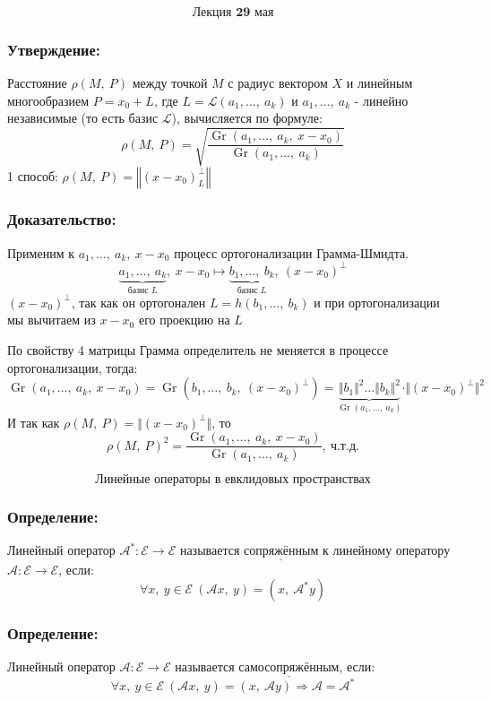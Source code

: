 \documentclass[12pt, letterpaper, twoside]{article}
\newcommand{\Underl}[1]{$\underline{\text{#1}}$}
\newcommand{\Gr}{\operatorname{Gr}}
\begin{document}
\[\textbf{Лекция 29 мая}\]

    \subsubsection*{Утверждение:}
    Расстояние $\rho (M,\ P)$ между точкой $M$ с радиус вектором $X$ и линейным многообразием $P = x_0 + L$, где $L = \mathcal{L}(a_1,\dots,\ a_k)$ и $a_1,\dots,\ a_k$ - линейно независимые (то есть базис $\mathcal{L}$), вычисляется по формуле:
    \[\rho(M,\ P) = \sqrt{\frac{\Gr(a_1,\dots,\ a_k,\ x - x_0)}{\Gr(a_1,\dots,\ a_k)}}\]
    1 способ: $\rho (M,\ P) = \left\Vert (x - x_0)^{\bot}_L \right\Vert$
    \subsubsection*{Доказательство:}
    Применим к $a_1,\dots,\ a_k,\ x - x_0$ процесс ортогонализации Грамма-Шмидта.
    \[\underset{\text{базис $L$}}{\underbrace{a_1,\dots,\ a_k}},\ x - x_0\longmapsto \underset{\text{базис $L$}}{\underbrace{b_1,\dots,\ b_k}},\ (x - x_0)^{\bot}\]
    $(x - x_0)^{\bot}$, так как он ортогонален $L = h(b_1,\dots,\ b_k)$ и при ортогонализации мы вычитаем из $x - x_0$ его проекцию на $L$

    По свойству 4 матрицы Грамма определитель не меняется в процессе ортогонализации, тогда:
    \[\Gr(a_1,\dots,\ a_k,\ x - x_0) = \Gr(b_1,\dots,\ b_k,\ (x - x_0)^{\bot}) = \underset{\Gr(a_1,\dots,\ a_k)}{\underbrace{\Vert b_1\Vert^2\dots \Vert b_k \Vert ^2}} \cdot \Vert (x - x_0)^{\bot}\Vert^2\]
    И так как $\rho(M,\ P) = \Vert (x - x_0)^{\bot}\Vert$, то
    \[\rho(M,\ P)^2 = \frac{\Gr(a_1,\dots,\ a_k,\ x - x_0)}{\Gr(a_1,\dots,\ a_k)},\ \text{ч.т.д.}\]

    \[\text{Линейные операторы в евклидовых пространствах}\]
    \subsubsection*{Определение:}
    Линейный оператор $\mathcal{A}^*: \mathcal{E}\longrightarrow \mathcal{E}$ называется \Underl{сопряжённым} к линейному оператору $\mathcal{A}: \mathcal{E} \longrightarrow \mathcal{E}$, если:
    \[\forall x,\ y\in\mathcal{E}\ (\mathcal{A} x,\ y) = (x,\ \mathcal{A}^* y)\]

    \subsubsection*{Определение:}
    Линейный оператор $\mathcal{A}: \mathcal{E} \longrightarrow \mathcal{E}$ называется \Underl{самосопряжённым}, если:
    \[\forall x,\ y\in\mathcal{E}\ (\mathcal{A}x,\ y) = (x,\ \mathcal{A}y)\Rightarrow \mathcal{A} = \mathcal{A}^*\]
\end{document}
